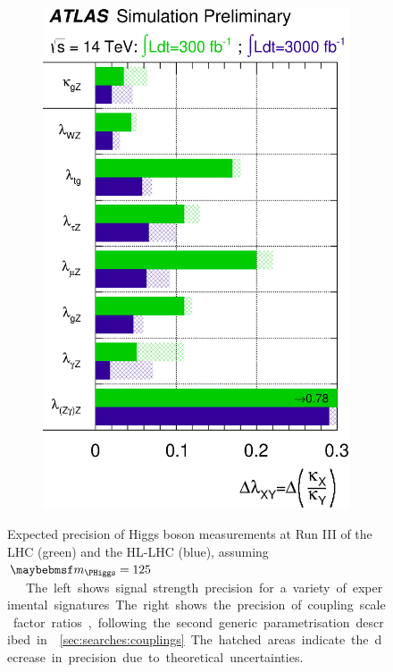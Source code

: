 \begin{figure}[t]
\begin{subfigure}[t]{0.495\textwidth}
		\includegraphics[width=\textwidth]{tex/conclusions/prospects_couplings}
	\end{subfigure}
	\caption{Expected precision of Higgs boson measurements at Run III of the LHC (green) 
	and the HL-LHC (blue), assuming \unit{$\mH = 125$}{\GeV} \cite{ATLAS:prospects}. The 
	left shows signal strength precision for a variety of experimental signatures. The 
	right shows the precision of coupling scale factor ratios, following the second 
	generic parametrisation described in \Section~\ref{sec:searches:couplings}. The 
	hatched areas indicate the decrease in precision due to theoretical uncertainties.}
	\label{fig:concl:prospects}
\end{figure}

